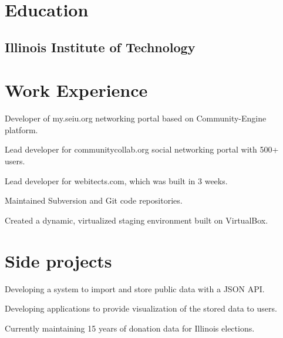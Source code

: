 \documentclass{resume}
\begin{document}
\author{Dmitry Ratnikov}
\maketitle

\section{Education}

\subsection{Illinois Institute of Technology}


\section{Work Experience}


\begin{compactitem}
  \item Developer of my.seiu.org networking portal based on Community-Engine platform.
  \item Lead developer for communitycollab.org social networking portal with 500+ users.
  \item Lead developer for webitects.com, which was built in 3 weeks.
  \item Maintained Subversion and Git code repositories.
  \item Created a dynamic, virtualized staging environment built on VirtualBox.
\end{compactitem}

\section{Side projects}
\begin{compactitem}
  \item Developing a system to import and store public data with a JSON API.
  \item Developing applications to provide visualization of the stored data to users.
  \item Currently maintaining 15 years of donation data for Illinois elections.
\end{compactitem}
\end{document}
